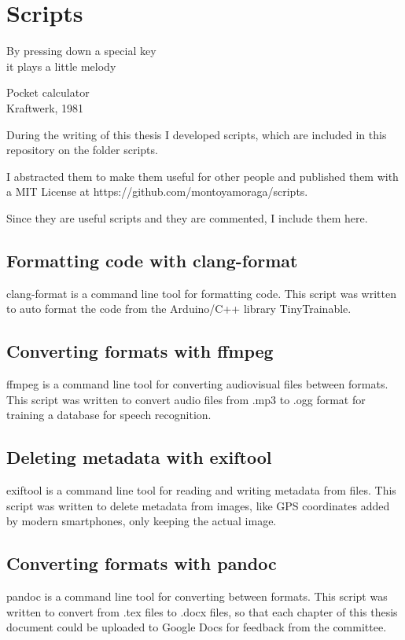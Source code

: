 \chapter{Scripts}

\epigraph{By pressing down a special key \\ it plays a little melody}{Pocket calculator \\ Kraftwerk, 1981}

During the writing of this thesis I developed scripts, which are included in this repository on the folder scripts.

I abstracted them to make them useful for other people and published them with a MIT License at https://github.com/montoyamoraga/scripts.

Since they are useful scripts and they are commented, I include them here.

\section{Formatting code with clang-format}

clang-format is a command line tool for formatting code. This script was written to auto format the code from the Arduino/C++ library TinyTrainable.



\section{Converting formats with ffmpeg}

ffmpeg is a command line tool for converting audiovisual files between formats. This script was written to convert audio files from .mp3 to .ogg format for training a database for speech recognition.



\section{Deleting metadata with exiftool}

exiftool is a command line tool for reading and writing metadata from files. This script was written to delete metadata from images, like GPS coordinates added by modern smartphones, only keeping the actual image.



\section{Converting formats with pandoc}

pandoc is a command line tool for converting between formats. This script was written to convert from .tex files to .docx files, so that each chapter of this thesis document could be uploaded to Google Docs for feedback from the committee.


